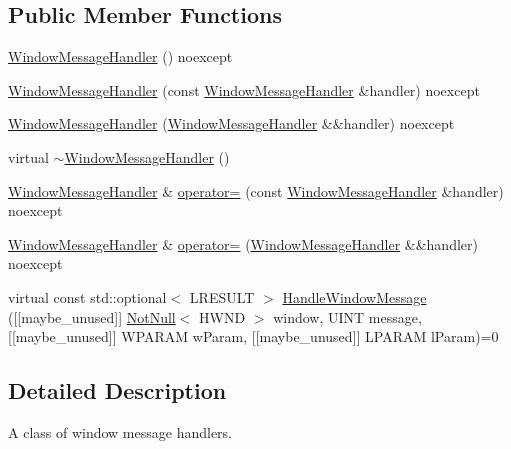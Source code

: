 \subsection*{Public Member Functions}
\begin{DoxyCompactItemize}
\item 
\mbox{\hyperlink{classmage_1_1_window_message_handler_ae2213e3ff0a7c418ecfed87cfa43a8b7}{Window\+Message\+Handler}} () noexcept
\item 
\mbox{\hyperlink{classmage_1_1_window_message_handler_a2dd683eafde6c68efc55aebc8460fb0a}{Window\+Message\+Handler}} (const \mbox{\hyperlink{classmage_1_1_window_message_handler}{Window\+Message\+Handler}} \&handler) noexcept
\item 
\mbox{\hyperlink{classmage_1_1_window_message_handler_ab6fe3eac35ef7262941dae8e65841d88}{Window\+Message\+Handler}} (\mbox{\hyperlink{classmage_1_1_window_message_handler}{Window\+Message\+Handler}} \&\&handler) noexcept
\item 
virtual \mbox{\hyperlink{classmage_1_1_window_message_handler_a24eae1a24e783b22fce2c7fdd8e14fef}{$\sim$\+Window\+Message\+Handler}} ()
\item 
\mbox{\hyperlink{classmage_1_1_window_message_handler}{Window\+Message\+Handler}} \& \mbox{\hyperlink{classmage_1_1_window_message_handler_a6f48f6a94d62bee913e5f0fabc166cab}{operator=}} (const \mbox{\hyperlink{classmage_1_1_window_message_handler}{Window\+Message\+Handler}} \&handler) noexcept
\item 
\mbox{\hyperlink{classmage_1_1_window_message_handler}{Window\+Message\+Handler}} \& \mbox{\hyperlink{classmage_1_1_window_message_handler_acb05035c5d298e7a1db0e8e2c1fcb71d}{operator=}} (\mbox{\hyperlink{classmage_1_1_window_message_handler}{Window\+Message\+Handler}} \&\&handler) noexcept
\item 
virtual const std\+::optional$<$ L\+R\+E\+S\+U\+LT $>$ \mbox{\hyperlink{classmage_1_1_window_message_handler_ab21ca7aaf638ed6233fb9142b82393d7}{Handle\+Window\+Message}} (\mbox{[}\mbox{[}maybe\+\_\+unused\mbox{]}\mbox{]} \mbox{\hyperlink{namespacemage_a8769f9d670d6b585ea306cb1062af94b}{Not\+Null}}$<$ H\+W\+ND $>$ window, U\+I\+NT message, \mbox{[}\mbox{[}maybe\+\_\+unused\mbox{]}\mbox{]} W\+P\+A\+R\+AM w\+Param, \mbox{[}\mbox{[}maybe\+\_\+unused\mbox{]}\mbox{]} L\+P\+A\+R\+AM l\+Param)=0
\end{DoxyCompactItemize}


\subsection{Detailed Description}
A class of window message handlers. 

